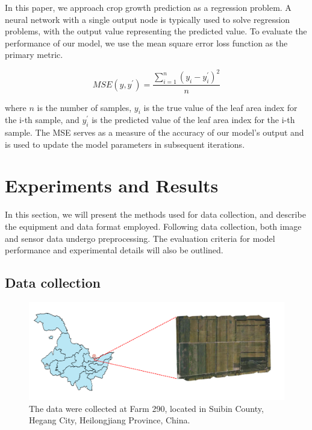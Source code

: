 \documentclass[acmsmall, screen]{acmart}
\begin{document}
In this paper, we approach crop growth prediction as a regression problem. A neural network with a single output node is typically used to solve regression problems, with the output value representing the predicted value. To evaluate the performance of our model, we use the mean square error loss function as the primary metric.

\begin{equation}
  MSE\left(y,y^\prime\right)=\frac{\sum_{i=1}^{n}\left(y_i-y_i^\prime\right)^2}{n}
\end{equation}

where \begin{math}
  n
\end{math} is the number of samples, \begin{math}
  y_i
\end{math} is the true value of the leaf area index for the i-th sample, and \begin{math}
  y_i^\prime
\end{math} is the predicted value of the leaf area index for the i-th sample. The MSE serves as a measure of the accuracy of our model’s output and is used to update the model parameters in subsequent iterations.

\section{Experiments and Results}

In this section, we will present the methods used for data collection, and describe the equipment and data format employed. Following data collection, both image and sensor data undergo preprocessing. The evaluation criteria for model performance and experimental details will also be outlined.


\subsection{Data collection}

\begin{figure}[htbp]
  \centering
  \includegraphics[width=\linewidth]{pic/farm_location.png}
  \caption{The data were collected at Farm 290, located in Suibin County, Hegang City, Heilongjiang Province, China.}
  \label{farm_location}
\end{figure}
\end{document}
